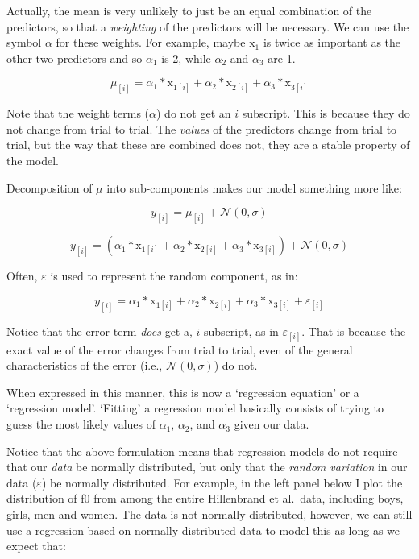 \documentclass[
]{book}
\begin{document}
Actually, the mean is very unlikely to just be an equal combination of the predictors, so that a \emph{weighting} of the predictors will be necessary. We can use the symbol \(\alpha\) for these weights. For example, maybe \(\mathrm{x}_{1}\) is twice as important as the other two predictors and so \(\alpha_1\) is 2, while \(\alpha_2\) and \(\alpha_3\) are 1.

\[
\mu_{[i]} = \alpha_1*\mathrm{x}_{1[i]} + \alpha_2*\mathrm{x}_{2[i]} + \alpha_3*\mathrm{x}_{3[i]}  
\label{eq:6}
\]

Note that the weight terms (\(\alpha\)) do not get an \(i\) subscript. This is because they do not change from trial to trial. The \emph{values} of the predictors change from trial to trial, but the way that these are combined does not, they are a stable property of the model.

Decomposition of \(\mu\) into sub-components makes our model something more like:

\[
y_{[i]} = \mu_{[i]} + \mathcal{N}(0,\sigma)  
\label{eq:7}
\]

\[
y_{[i]} =  (\alpha_1*\mathrm{x}_{1[i]} + \alpha_2*\mathrm{x}_{2[i]} + \alpha_3*\mathrm{x}_{3[i]} ) + \mathcal{N}(0,\sigma)  
\label{eq:8}
\]

Often, \(\varepsilon\) is used to represent the random component, as in:

\[
y_{[i]} = \alpha_1*\mathrm{x}_{1[i]} + \alpha_2*\mathrm{x}_{2[i]} + \alpha_3*\mathrm{x}_{3[i]}+ \varepsilon_{[i]}
\label{eq:9}
\]

Notice that the error term \emph{does} get a, \(i\) subscript, as in \(\varepsilon_{[i]}\). That is because the exact value of the error changes from trial to trial, even of the general characteristics of the error (i.e., \(\mathcal{N}(0,\sigma)\)) do not.

When expressed in this manner, this is now a `regression equation' or a `regression model'. `Fitting' a regression model basically consists of trying to guess the most likely values of \(\alpha_1\), \(\alpha_2\), and \(\alpha_3\) given our data.

Notice that the above formulation means that regression models do not require that our \emph{data} be normally distributed, but only that the \emph{random variation} in our data (\(\varepsilon\)) be normally distributed. For example, in the left panel below I plot the distribution of f0 from among the entire Hillenbrand et al.~data, including boys, girls, men and women. The data is not normally distributed, however, we can still use a regression based on normally-distributed data to model this as long as we expect that:
\end{document}
